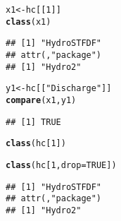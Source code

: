 \documentclass{icldt}\usepackage[]{graphicx}\usepackage[]{color}
\makeatletter
\newcommand{\hlnum}[1]{\textcolor[rgb]{0.686,0.059,0.569}{#1}}%
\newcommand{\hlstr}[1]{\textcolor[rgb]{0.192,0.494,0.8}{#1}}%
\newcommand{\hlstd}[1]{\textcolor[rgb]{0.345,0.345,0.345}{#1}}%
\newcommand{\hlkwb}[1]{\textcolor[rgb]{0.69,0.353,0.396}{#1}}%
\newcommand{\hlkwc}[1]{\textcolor[rgb]{0.333,0.667,0.333}{#1}}%
\newcommand{\hlkwd}[1]{\textcolor[rgb]{0.737,0.353,0.396}{\textbf{#1}}}%
\newenvironment{kframe}{%
 \def\at@end@of@kframe{}%
 \ifinner\ifhmode%
  \def\at@end@of@kframe{\end{minipage}}%
  \begin{minipage}{\columnwidth}%
 \fi\fi%
 \def\FrameCommand##1{\hskip\@totalleftmargin \hskip-\fboxsep
 \colorbox{shadecolor}{##1}\hskip-\fboxsep
     \hskip-\linewidth \hskip-\@totalleftmargin \hskip\columnwidth}%
 \MakeFramed {\advance\hsize-\width
   \@totalleftmargin\z@ \linewidth\hsize
   \@setminipage}}%
 {\par\unskip\endMakeFramed%
 \at@end@of@kframe}
\newenvironment{knitrout}{}{} %
\makeatother
\begin{document}
\begin{knitrout}
\color{fgcolor}\begin{kframe}
\begin{alltt}
\hlstd{x1} \hlkwb{<-} \hlstd{hc[[}\hlnum{1}\hlstd{]]}
\hlkwd{class}\hlstd{(x1)}
\end{alltt}
\begin{verbatim}
## [1] "HydroSTFDF"
## attr(,"package")
## [1] "Hydro2"
\end{verbatim}
\begin{alltt}
\hlstd{y1} \hlkwb{<-} \hlstd{hc[[}\hlstr{"Discharge"}\hlstd{]]}
\hlkwd{compare}\hlstd{(x1, y1)}
\end{alltt}
\begin{verbatim}
## [1] TRUE
\end{verbatim}
\begin{alltt}
\hlkwd{class}\hlstd{(hc[}\hlnum{1}\hlstd{])}
\end{alltt}


{\ttfamily\noindent\bfseries{}}\begin{alltt}
\hlkwd{class}\hlstd{(hc[}\hlnum{1}\hlstd{,} \hlkwc{drop}\hlstd{=}\hlnum{TRUE}\hlstd{])}
\end{alltt}
\begin{verbatim}
## [1] "HydroSTFDF"
## attr(,"package")
## [1] "Hydro2"
\end{verbatim}
\end{kframe}
\end{knitrout}



\end{document}
